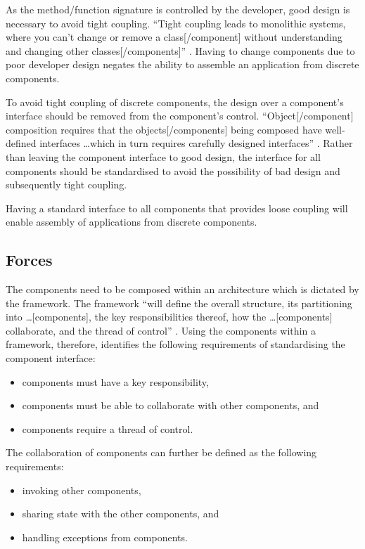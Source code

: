 \documentclass[prodmode]{style/acmlarge}
\begin{document}
As the method/function signature is controlled by the developer, good design is
necessary to avoid tight coupling.  ``Tight coupling leads to monolithic
systems, where you can't change or remove a class[/component] without
understanding and changing other classes[/components]'' \cite[p. 24-25]{gof}.
Having to change components due to poor developer design negates the ability to
assemble an application from discrete components.

To avoid tight coupling of discrete components, the design over a component's
interface should be removed from the component's control. ``Object[/component]
composition requires that the objects[/components] being composed have
well-defined interfaces \ldots which in turn requires carefully designed
interfaces'' \cite[p. 19]{gof}.  Rather than leaving the component interface to
good design, the interface for all components should be standardised to avoid
the possibility of bad design and subsequently tight coupling.

Having a standard interface to all components that provides loose coupling will
enable assembly of applications from discrete components.


\subsection{Forces}

The components need to be composed within an architecture which is dictated by
the framework.  The framework ``will define the overall structure, its
partitioning into \ldots [components], the key responsibilities thereof, how the
\ldots [components] collaborate, and the thread of control'' \cite[p.26]{gof}. 
Using the components within a framework, therefore, identifies the following
requirements of standardising the component interface:
\begin{itemize}
  \item components must have a key responsibility,
  \item components must be able to collaborate with other components, and
  \item components require a thread of control.
\end{itemize}

The collaboration of components can further be defined as the following
requirements:
\begin{itemize}
  \item invoking other components,
  \item sharing state with the other components, and
  \item handling exceptions from components.
\end{itemize}
\end{document}
